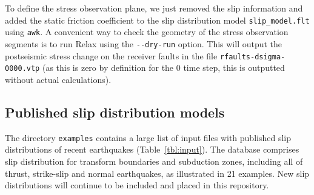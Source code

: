 \documentclass[10pt]{article}
\begin{document}
To define the stress observation plane, we just removed the slip information and added the static friction coefficient to the slip distribution model \verb'slip_model.flt' using \verb'awk'. A convenient way to check the geometry of the stress observation segments is to run Relax using the \verb'--dry-run' option. This will output the postseismic stress change on the receiver faults in the file \verb'rfaults-dsigma-0000.vtp' (as this is zero by definition for the 0 time step, this is outputted without actual calculations). 



\subsection{Published slip distribution models}

The directory \verb'examples' contains a large list of input files with published slip distributions of recent earthquakes (Table~\ref{tbl:input}). The database comprises slip distribution for transform boundaries and subduction zones, including all of thrust, strike-slip and normal earthquakes, as illustrated in 21 examples. New slip distributions will continue to be included and placed in this repository.
\end{document}
